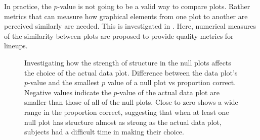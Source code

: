 \documentclass[12pt]{article}
\newcommand{\blue}[1]{{\color{blue} #1}} %
\newcommand{\green}[1]{{\color{green} #1}} %
\begin{document}



In practice, the $p$-value is not going to be a valid way to compare plots. Rather metrics that can measure how graphical elements from one plot to another are perceived similarly are needed. This is investigated in \citet{niladri:2012:blinded}. Here, numerical measures of the similarity between plots are proposed to provide quality metrics for lineups.


\begin{figure}[hbtp]
   \centering
       \caption{Investigating how the strength of structure in the null plots affects the choice of the actual data plot. Difference between the data plot's $p$-value and the  smallest $p$ value of a null plot vs proportion correct. Negative values indicate the $p$-value of the actual data plot are smaller than those of all of the null plots. Close to zero shows a wide range in the proportion correct, suggesting that when at least one null plot has structure almost as strong as the actual data plot, subjects had a difficult time in making their choice.}
       \label{fig:pval_difference}
\end{figure}
\end{document}
